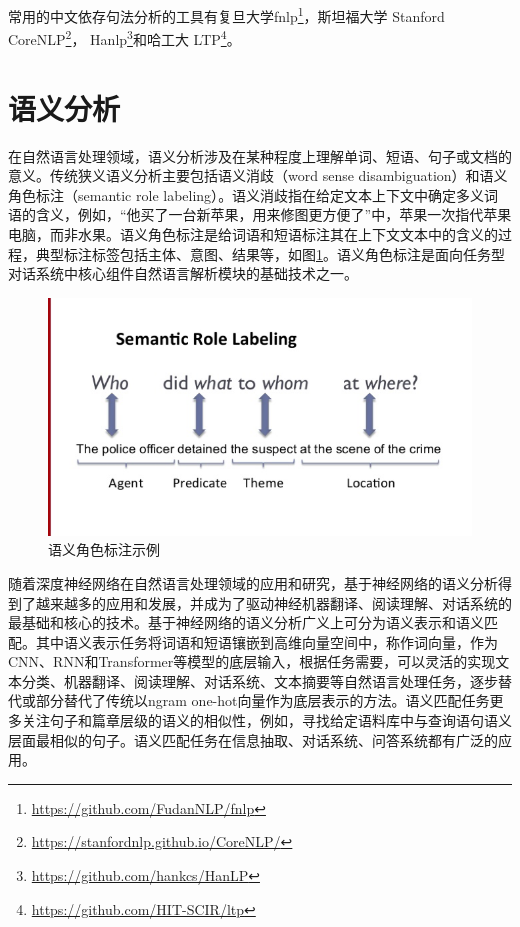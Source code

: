 常用的中文依存句法分析的工具有复旦大学fnlp\footnote{\url{https://github.com/FudanNLP/fnlp}}，斯坦福大学 Stanford CoreNLP\footnote{\url{https://stanfordnlp.github.io/CoreNLP/}}， Hanlp\footnote{\url{https://github.com/hankcs/HanLP}}和哈工大 LTP\footnote{\url{https://github.com/HIT-SCIR/ltp}}。





\section{语义分析}
在自然语言处理领域，语义分析涉及在某种程度上理解单词、短语、句子或文档的意义。传统狭义语义分析主要包括语义消歧（word sense disambiguation）\cite{ yarowsky1995unsupervised}和语义角色标注（semantic role labeling）\cite{ carreras2005introduction, bjorkelund2009multilingual}。语义消歧指在给定文本上下文中确定多义词语的含义，例如，“他买了一台新苹果，用来修图更方便了”中，苹果一次指代苹果电脑，而非水果。语义角色标注是给词语和短语标注其在上下文文本中的含义的过程，典型标注标签包括主体、意图、结果等，如图\ref{fig:semantic_role_label}。语义角色标注是面向任务型对话系统中核心组件自然语言解析模块的基础技术之一。

\begin{figure}[h]
\centering
\includegraphics[scale=1]{img/chapter_nlp/guang_analysis_1.png}
\caption{语义角色标注示例}
\label{fig:semantic_role_label}
\end{figure}

随着深度神经网络在自然语言处理领域的应用和研究，基于神经网络的语义分析得到了越来越多的应用和发展，并成为了驱动神经机器翻译\cite{ bahdanau2014neural, luong2015effective}、阅读理解\cite{ hermann2015teaching}、对话系统\cite{ serban2016building, chen2017survey}的最基础和核心的技术。基于神经网络的语义分析广义上可分为语义表示和语义匹配。其中语义表示任务将词语和短语镶嵌到高维向量空间中，称作词向量，作为CNN\cite{ lecun1995convolutional}、RNN\cite{ hochreiter1997long}和Transformer\cite{ vaswani2017attention}等模型的底层输入，根据任务需要，可以灵活的实现文本分类\cite{ joulin2016bag, zhang2015character}、机器翻译、阅读理解、对话系统、文本摘要\cite{ tan2017abstractive, yao2017recent}等自然语言处理任务，逐步替代或部分替代了传统以ngram one-hot向量作为底层表示的方法。语义匹配任务更多关注句子和篇章层级的语义的相似性，例如，寻找给定语料库中与查询语句语义层面最相似的句子。语义匹配任务在信息抽取、对话系统、问答系统都有广泛的应用。

